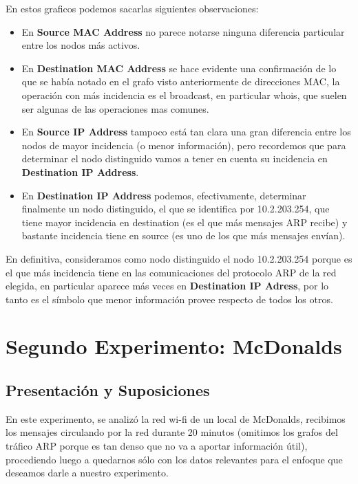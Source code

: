 \documentclass{article}
\theoremstyle{definition}
\theoremstyle{remark}
\begin{document}
En estos graficos podemos sacarlas siguientes observaciones:

\begin{itemize}
 
\item En \textbf{Source MAC Address} no parece notarse ninguna diferencia particular entre los nodos más activos.

\item En \textbf{Destination MAC Address} se hace evidente una confirmación de lo que se había notado en el grafo visto anteriormente de direcciones MAC, la operación con más incidencia es el broadcast, en particular whois, que suelen ser algunas de las operaciones mas comunes.

\item En \textbf{Source IP Address} tampoco está tan clara una gran diferencia entre los nodos de mayor incidencia (o menor información), pero recordemos que para determinar el nodo distinguido vamos a tener en cuenta su incidencia en \textbf{Destination IP Address}.

\item En \textbf{Destination IP Address} podemos, efectivamente, determinar finalmente un nodo distinguido, el que se identifica por 10.2.203.254, que tiene mayor incidencia en destination (es el que más mensajes ARP recibe) y bastante incidencia tiene en source (es uno de los que más mensajes envían). 

\end{itemize}

En definitiva, consideramos como nodo distinguido el nodo 10.2.203.254 porque es el que más incidencia tiene en las comunicaciones del protocolo ARP de la red elegida, en particular aparece más veces en \textbf{Destination IP Adress}, por lo tanto es el símbolo que menor información provee respecto de todos los otros.

\newpage

\section{Segundo Experimento: McDonalds}

\subsection{Presentación y Suposiciones}

En este experimento, se analizó la red wi-fi de un local de McDonalds, recibimos los mensajes circulando por la red durante 20 minutos (omitimos los grafos del tráfico ARP porque es tan denso que no va a aportar información útil), procediendo luego a quedarnos sólo con los datos relevantes para el enfoque que deseamos darle a nuestro experimento.
\end{document}
